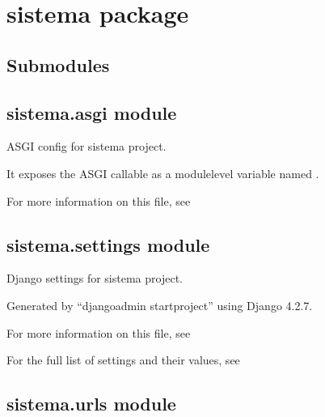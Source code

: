 \documentclass[letterpaper,10pt,spanish]{sphinxmanual}
\begin{document}
\chapter{sistema package}
\label{\detokenize{modules/sistema:sistema-package}}\label{\detokenize{modules/sistema::doc}}

\section{Submodules}
\label{\detokenize{modules/sistema:submodules}}

\section{sistema.asgi module}
\label{\detokenize{modules/sistema:module-sistema.asgi}}\label{\detokenize{modules/sistema:sistema-asgi-module}}
\sphinxAtStartPar
ASGI config for sistema project.

\sphinxAtStartPar
It exposes the ASGI callable as a module\sphinxhyphen{}level variable named .

\sphinxAtStartPar
For more information on this file, see


\section{sistema.settings module}
\label{\detokenize{modules/sistema:module-sistema.settings}}\label{\detokenize{modules/sistema:sistema-settings-module}}
\sphinxAtStartPar
Django settings for sistema project.

\sphinxAtStartPar
Generated by “django\sphinxhyphen{}admin startproject” using Django 4.2.7.

\sphinxAtStartPar
For more information on this file, see

\sphinxAtStartPar
For the full list of settings and their values, see


\section{sistema.urls module}
\label{\detokenize{modules/sistema:module-sistema.urls}}\label{\detokenize{modules/sistema:sistema-urls-module}}
\end{document}

